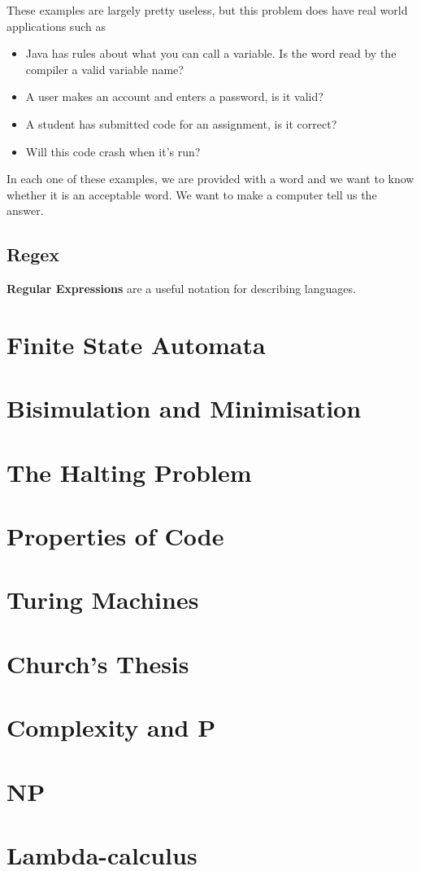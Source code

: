 \documentclass[11pt]{article}
\begin{document}
	These examples are largely pretty useless, but this problem does have real world applications such as 
	\begin{itemize}
		\item Java has rules about what you can call a variable. Is the word read by the compiler a valid variable name?
		\item A user makes an account and enters a password, is it valid?
		\item A student has submitted code for an assignment, is it correct?
		\item Will this code crash when it's run?
	\end{itemize}
	
	In each one of these examples, we are provided with a word and we want to know whether it is an acceptable word. We want to make a computer tell us the answer.
	
	
	\subsection{Regex}
	\textbf{Regular Expressions} are a useful notation for describing languages.
	
	
	\section{Finite State Automata}
	
	\section{Bisimulation and Minimisation}
	
	\section{The Halting Problem}
	
	\section{Properties of Code}
	
	\section{Turing Machines}
	
	\section{Church's Thesis}
	
	\section{Complexity and P}
	
	\section{NP}
	
	\section{Lambda-calculus}
	
\end{document}

